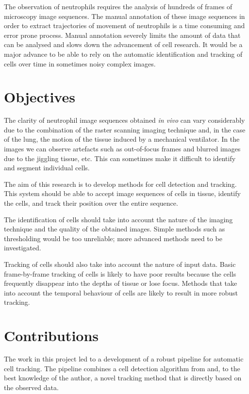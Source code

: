 		The observation of neutrophils requires the analysis of hundreds of frames of microscopy image sequences. The manual annotation of these image sequences in order to extract trajectories of movement of neutrophils is a time consuming and error prone process. Manual annotation severely limits the amount of data that can be analysed and slows down the advancement of cell research. It would be a major advance to be able to rely on the automatic identification and tracking of cells over time in sometimes noisy complex images.
		
	\section{Objectives \statusfirstdraft}
		
		The clarity of neutrophil image sequences obtained \textit{in vivo} can vary considerably due to the combination of the raster scanning imaging technique and, in the case of the lung, the motion of the tissue induced by a mechanical ventilator. In the images we can observe artefacts such as out-of-focus frames and blurred images due to the jiggling tissue, etc. This can sometimes make it difficult to identify and segment individual cells.
		
		The aim of this research is to develop methods for cell detection and tracking. This system should be able to accept image sequences of cells in tissue, identify the cells, and track their position over the entire sequence.
		
		The identification of cells should take into account the nature of the imaging technique and the quality of the obtained images. Simple methods such as thresholding would be too unreliable; more advanced methods need to be investigated.
		
		Tracking of cells should also take into account the nature of input data. Basic frame-by-frame tracking of cells is likely to have poor results because the cells frequently disappear into the depths of tissue or lose focus. Methods that take into account the temporal behaviour of cells are likely to result in more robust tracking.
		
	\section{Contributions \statusfirstdraft}
		
		The work in this project led to a development of a robust pipeline for automatic cell tracking. The pipeline combines a cell detection algorithm from \cite{arteta12} and, to the best knowledge of the author, a novel tracking method that is directly based on the observed data. 
		
